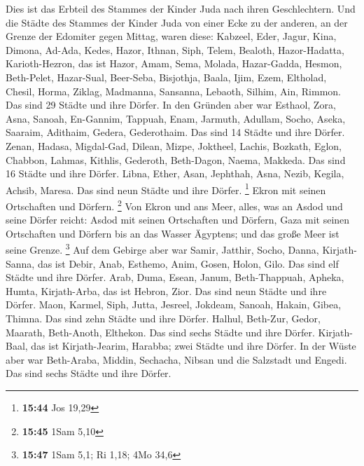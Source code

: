  Dies ist das Erbteil des Stammes der Kinder Juda nach
ihren Geschlechtern.  Und die Städte des Stammes der
Kinder Juda von einer Ecke zu der anderen, an der Grenze der Edomiter
gegen Mittag, waren diese: Kabzeel, Eder, Jagur,  Kina,
Dimona, Ad-Ada,  Kedes, Hazor, Ithnan, 
Siph, Telem, Bealoth,  Hazor-Hadatta, Karioth-Hezron, das
ist Hazor,  Amam, Sema, Molada, 
Hazar-Gadda, Hesmon, Beth-Pelet,  Hazar-Sual, Beer-Seba,
Bisjothja,  Baala, Ijim, Ezem,  Eltholad,
Chesil, Horma,  Ziklag, Madmanna, Sansanna,
 Lebaoth, Silhim, Ain, Rimmon. Das sind 29 Städte und
ihre Dörfer.  In den Gründen aber war Esthaol, Zora,
Asna,  Sanoah, En-Gannim, Tappuah, Enam, 
Jarmuth, Adullam, Socho, Aseka,  Saaraim, Adithaim,
Gedera, Gederothaim. Das sind 14 Städte und ihre Dörfer. 
Zenan, Hadasa, Migdal-Gad,  Dilean, Mizpe, Joktheel,
 Lachis, Bozkath, Eglon,  Chabbon, Lahmas,
Kithlis,  Gederoth, Beth-Dagon, Naema, Makkeda. Das sind
16 Städte und ihre Dörfer.  Libna, Ether, Asan,
 Jephthah, Asna, Nezib,  Kegila, Achsib,
Maresa. Das sind neun Städte und ihre Dörfer. \footnote{\textbf{15:44}
  Jos 19,29}  Ekron mit seinen Ortschaften und Dörfern.
\footnote{\textbf{15:45} 1Sam 5,10}  Von Ekron und ans
Meer, alles, was an Asdod und seine Dörfer reicht:  Asdod
mit seinen Ortschaften und Dörfern, Gaza mit seinen Ortschaften und
Dörfern bis an das Wasser Ägyptens; und das große Meer ist seine Grenze.
\footnote{\textbf{15:47} 1Sam 5,1; Ri 1,18; 4Mo 34,6} 
Auf dem Gebirge aber war Samir, Jatthir, Socho,  Danna,
Kirjath-Sanna, das ist Debir,  Anab, Esthemo, Anim,
 Gosen, Holon, Gilo. Das sind elf Städte und ihre Dörfer.
 Arab, Duma, Esean,  Janum, Beth-Thappuah,
Apheka,  Humta, Kirjath-Arba, das ist Hebron, Zior. Das
sind neun Städte und ihre Dörfer.  Maon, Karmel, Siph,
Jutta,  Jesreel, Jokdeam, Sanoah,  Hakain,
Gibea, Thimna. Das sind zehn Städte und ihre Dörfer. 
Halhul, Beth-Zur, Gedor,  Maarath, Beth-Anoth, Elthekon.
Das sind sechs Städte und ihre Dörfer.  Kirjath-Baal, das
ist Kirjath-Jearim, Harabba; zwei Städte und ihre Dörfer.
 In der Wüste aber war Beth-Araba, Middin, Sechacha,
 Nibsan und die Salzstadt und Engedi. Das sind sechs
Städte und ihre Dörfer.

